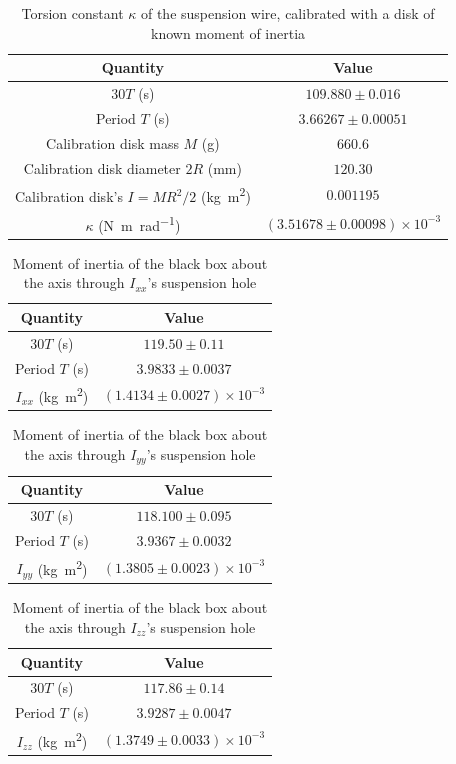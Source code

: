 \begin{table}[htb!]
\centering
\caption{Torsion constant $\kappa$ of the suspension wire, calibrated with a disk of known moment of inertia}
\begin{tabular}{cc}
\toprule
Quantity & Value \\
\midrule
$30T$ (\unit{\s}) & $109.880 \pm 0.016$ \\
Period $T$ (\unit{\s}) & $3.66267 \pm 0.00051$ \\
Calibration disk mass $M$ (\unit{\g}) & $660.6$ \\
Calibration disk diameter $2R$ (\unit{\mm}) & $120.30$ \\
Calibration disk's $I=M R^{2}/2$ (\unit{\kg\m\squared}) & $0.001195$ \\
$\kappa$ (\unit{\N\m\per\radian}) & $(3.51678 \pm 0.00098)\times 10^{-3}$ \\
\bottomrule
\end{tabular}
\end{table}
\begin{table}[htb!]
\centering
\caption{Moment of inertia of the black box about the axis through $I_{xx}$'s suspension hole}
\begin{tabular}{cc}
\toprule
Quantity & Value \\
\midrule
$30T$ (\unit{\s}) & $119.50 \pm 0.11$ \\
Period $T$ (\unit{\s}) & $3.9833 \pm 0.0037$ \\
$I_{xx}$ (\unit{\kg\m\squared}) & $(1.4134 \pm 0.0027)\times 10^{-3}$ \\
\bottomrule
\end{tabular}
\end{table}
\begin{table}[htb!]
\centering
\caption{Moment of inertia of the black box about the axis through $I_{yy}$'s suspension hole}
\begin{tabular}{cc}
\toprule
Quantity & Value \\
\midrule
$30T$ (\unit{\s}) & $118.100 \pm 0.095$ \\
Period $T$ (\unit{\s}) & $3.9367 \pm 0.0032$ \\
$I_{yy}$ (\unit{\kg\m\squared}) & $(1.3805 \pm 0.0023)\times 10^{-3}$ \\
\bottomrule
\end{tabular}
\end{table}
\begin{table}[htb!]
\centering
\caption{Moment of inertia of the black box about the axis through $I_{zz}$'s suspension hole}
\begin{tabular}{cc}
\toprule
Quantity & Value \\
\midrule
$30T$ (\unit{\s}) & $117.86 \pm 0.14$ \\
Period $T$ (\unit{\s}) & $3.9287 \pm 0.0047$ \\
$I_{zz}$ (\unit{\kg\m\squared}) & $(1.3749 \pm 0.0033)\times 10^{-3}$ \\
\bottomrule
\end{tabular}
\end{table}
